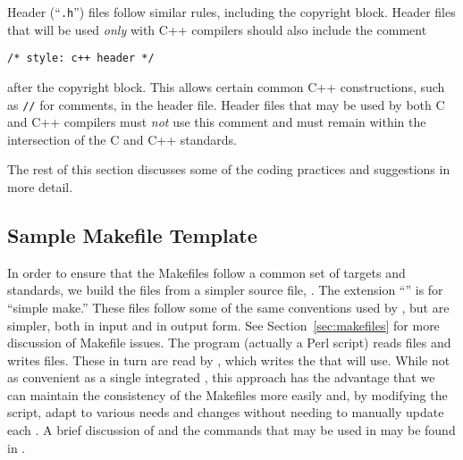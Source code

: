\documentclass{article}
\begin{document}

Header (``\texttt{.h}'') files follow similar rules, including the copyright
block.  Header files that will be used \emph{only} with C++ compilers should
also include the comment
\begin{verbatim}
/* style: c++ header */
\end{verbatim}
after the copyright block.  This allows certain common C++ constructions, such
as \texttt{//} for comments, in the header file.  Header files that may be
used by both C and C++ compilers must \emph{not} use this comment and
must remain within the intersection of the C and C++ standards.

The rest of this section discusses some of the coding practices and
suggestions in more detail.

\subsection{Sample Makefile Template}
\label{sec:makefile-template}

In order to ensure that the Makefiles follow a common set of targets and
standards, we build the  files from a simpler source file,
.  The extension ``'' is for ``simple make.''  These files
follow some of the same conventions used by , but are
simpler, both in input and in output form.
See Section~\ref{sec:makefiles} for more discussion of Makefile issues.
The program (actually a Perl script)  reads
 files and writes  files.  These in turn
are read by , which writes the  that
 will use.  While not as convenient as a single integrated
, this approach has the advantage that we can maintain the
consistency of the Makefiles more easily and, by modifying the
 script, adapt to various needs and changes without
needing to 
manually update each .  A brief discussion of
 and the commands that may be used in
 may be found in . 
\end{document}
